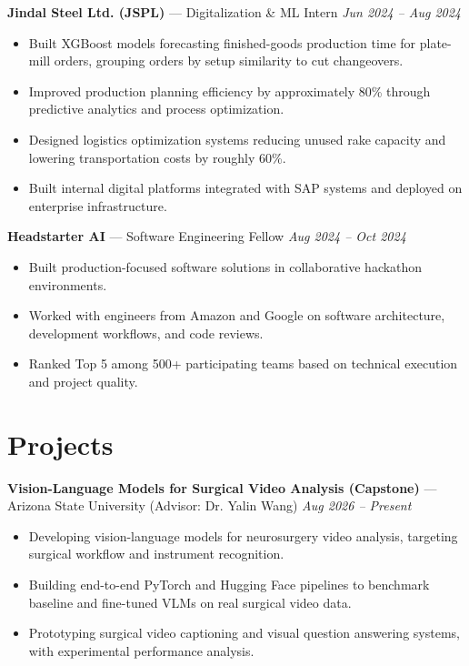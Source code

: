 \documentclass[a4paper,8pt]{extarticle}
\begin{document}
\noindent
\textbf{Jindal Steel Ltd. (JSPL)} --- Digitalization \& ML Intern
\hfill \textit{Jun 2024 -- Aug 2024}

\begin{itemize}
\item Built XGBoost models forecasting finished-goods production time for plate-mill orders, grouping orders by setup similarity to cut changeovers.
\item Improved production planning efficiency by approximately 80\% through predictive analytics and process optimization.
\item Designed logistics optimization systems reducing unused rake capacity and lowering transportation costs by roughly 60\%.
\item Built internal digital platforms integrated with SAP systems and deployed on enterprise infrastructure.
\end{itemize}

\noindent
\textbf{Headstarter AI} --- Software Engineering Fellow
\hfill \textit{Aug 2024 -- Oct 2024}

\begin{itemize}
\item Built production-focused software solutions in collaborative hackathon environments.
\item Worked with engineers from Amazon and Google on software architecture, development workflows, and code reviews.
\item Ranked Top 5 among 500+ participating teams based on technical execution and project quality.
\end{itemize}

\section*{Projects}

\noindent
\textbf{Vision-Language Models for Surgical Video Analysis (Capstone)} --- Arizona State University (Advisor: Dr. Yalin Wang)
\hfill \textit{Aug 2026 -- Present}

\begin{itemize}
\item Developing vision-language models for neurosurgery video analysis, targeting surgical workflow and instrument recognition.
\item Building end-to-end PyTorch and Hugging Face pipelines to benchmark baseline and fine-tuned VLMs on real surgical video data.
\item Prototyping surgical video captioning and visual question answering systems, with experimental performance analysis.
\end{itemize}
\end{document}

